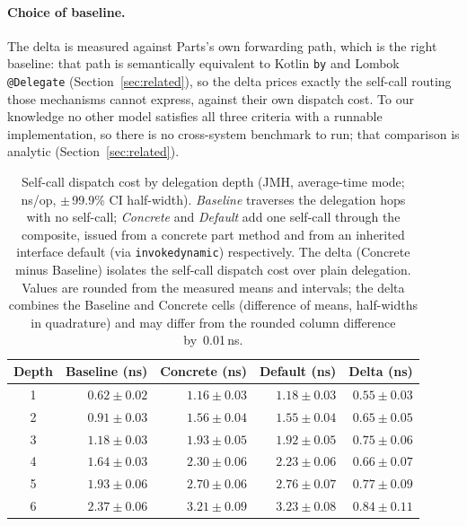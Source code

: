 \documentclass[acmsmall,nonacm]{acmart}
\theoremstyle{acmplain}
\theoremstyle{acmdefinition}
\newcommand{\code}[1]{\texttt{#1}}
\begin{document}
\paragraph{Choice of baseline.}
The delta is measured against Parts's own forwarding path, which is the right
baseline: that path is semantically equivalent to Kotlin \code{by} and Lombok
\code{@Delegate} (Section~\ref{sec:related}), so the delta prices exactly the
self-call routing those mechanisms cannot express, against their own dispatch
cost. To our knowledge no other model satisfies all three criteria with a
runnable implementation, so there is no cross-system benchmark to run; that
comparison is analytic (Section~\ref{sec:related}).

\begin{table}[htbp]
\centering
\caption{Self-call dispatch cost by delegation depth (JMH, average-time mode; ns/op, $\pm$\,99.9\% CI half-width). \emph{Baseline} traverses the delegation hops with no self-call; \emph{Concrete} and \emph{Default} add one self-call through the composite, issued from a concrete part method and from an inherited interface default (via \code{invokedynamic}) respectively. The delta (Concrete minus Baseline) isolates the self-call dispatch cost over plain delegation. Values are rounded from the measured means and intervals; the delta combines the Baseline and Concrete cells (difference of means, half-widths in quadrature) and may differ from the rounded column difference by~0.01\,ns.}
\label{tab:bench}
{\small
\begin{tabular}{crrrr}
\toprule
Depth & Baseline (ns) & Concrete (ns) & Default (ns) & Delta (ns) \\
\midrule
1 & $0.62 \pm 0.02$ & $1.16 \pm 0.03$ & $1.18 \pm 0.03$ & $0.55 \pm 0.03$ \\
2 & $0.91 \pm 0.03$ & $1.56 \pm 0.04$ & $1.55 \pm 0.04$ & $0.65 \pm 0.05$ \\
3 & $1.18 \pm 0.03$ & $1.93 \pm 0.05$ & $1.92 \pm 0.05$ & $0.75 \pm 0.06$ \\
4 & $1.64 \pm 0.03$ & $2.30 \pm 0.06$ & $2.23 \pm 0.06$ & $0.66 \pm 0.07$ \\
5 & $1.93 \pm 0.06$ & $2.70 \pm 0.06$ & $2.76 \pm 0.07$ & $0.77 \pm 0.09$ \\
6 & $2.37 \pm 0.06$ & $3.21 \pm 0.09$ & $3.23 \pm 0.08$ & $0.84 \pm 0.11$ \\
\bottomrule
\end{tabular}
}
\end{table}
\end{document}
